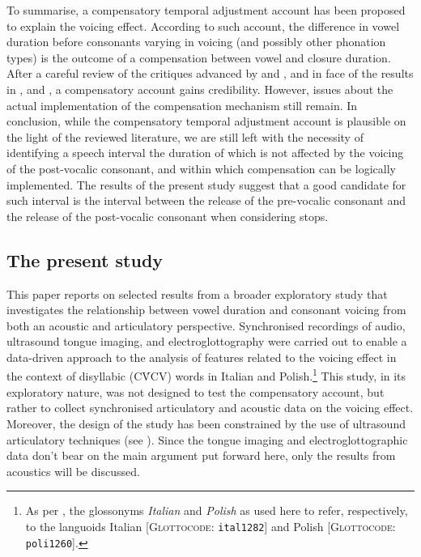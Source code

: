 \documentclass[12pt,]{article}
\let\rmarkdownfootnote\footnote%
\def\footnote{\protect\rmarkdownfootnote}
\begin{document}
To summarise, a compensatory temporal adjustment account has been
proposed to explain the voicing effect. According to such account, the
difference in vowel duration before consonants varying in voicing (and
possibly other phonation types) is the outcome of a compensation between
vowel and closure duration. After a careful review of the critiques
advanced by \citet{chen1970} and \citet{maddieson1976}, and in face of
the results in \citet{slis1969}, \citet{de-jong1991} and
\citet{begus2017}, a compensatory account gains credibility. However,
issues about the actual implementation of the compensation mechanism
still remain. In conclusion, while the compensatory temporal adjustment
account is plausible on the light of the reviewed literature, we are
still left with the necessity of identifying a speech interval the
duration of which is not affected by the voicing of the post-vocalic
consonant, and within which compensation can be logically implemented.
The results of the present study suggest that a good candidate for such
interval is the interval between the release of the pre-vocalic
consonant and the release of the post-vocalic consonant when considering
stops.

\hypertarget{the-present-study}{%
\subsection{The present study}\label{the-present-study}}

This paper reports on selected results from a broader exploratory study
that investigates the relationship between vowel duration and consonant
voicing from both an acoustic and articulatory perspective. Synchronised
recordings of audio, ultrasound tongue imaging, and electroglottography
were carried out to enable a data-driven approach to the analysis of
features related to the voicing effect in the context of disyllabic
(CV́CV) words in Italian and
Polish.\footnote{As per \citet{cysouw2013}, the glossonyms \textit{Italian} and \textit{Polish} as used here to refer, respectively, to the languoids Italian [\textsc{Glottocode}: \texttt{ital1282}] and Polish [\textsc{Glottocode}: \texttt{poli1260}].}
This study, in its exploratory nature, was not designed to test the
compensatory account, but rather to collect synchronised articulatory
and acoustic data on the voicing effect. Moreover, the design of the
study has been constrained by the use of ultrasound articulatory
techniques (see ). Since the tongue imaging and
electroglottographic data don't bear on the main argument put forward
here, only the results from acoustics will be discussed.
\end{document}
